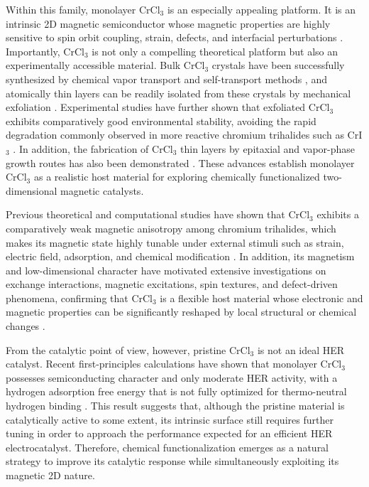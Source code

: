 \documentclass[journal=jacsat,manuscript=article]{achemso}
\begin{document}
Within this family, monolayer CrCl$_3$ is an especially appealing platform. It is an intrinsic 2D magnetic semiconductor whose magnetic properties are highly sensitive to spin orbit coupling, strain, defects, and interfacial perturbations \cite{Xue2019,Webster2018,Dupont2021,Lee2026,Zhu2025}. Importantly, CrCl$_3$ is not only a compelling theoretical platform but also an experimentally accessible material. Bulk CrCl$_3$ crystals have been successfully synthesized by chemical vapor transport \cite{Abdel-Hafiez2025} and self-transport methods \cite{Mastrippolito2021}, and atomically thin layers can be readily isolated from these crystals by mechanical exfoliation \cite{Kazim_2020}. Experimental studies have further shown that exfoliated CrCl$_3$ exhibits comparatively good environmental stability, avoiding the rapid degradation commonly observed in more reactive chromium trihalides such as CrI$_3$ \cite{Mastrippolito2021}. In addition, the fabrication of CrCl$_3$ thin layers by epitaxial and vapor-phase growth routes has also been demonstrated \cite{Bedoya2021,Wang2022}. These advances establish monolayer CrCl$_3$ as a realistic host material for exploring chemically functionalized two-dimensional magnetic catalysts.

Previous theoretical and computational studies have shown that CrCl$_3$ exhibits a comparatively weak magnetic anisotropy among chromium trihalides, which makes its magnetic state highly tunable under external stimuli such as strain, electric field, adsorption, and chemical modification \cite{Webster2018,Ebrahimian2023,Esteras2023}. In addition, its magnetism and low-dimensional character have motivated extensive investigations on exchange interactions, magnetic excitations, spin textures, and defect-driven phenomena, confirming that CrCl$_3$ is a flexible host material whose electronic and magnetic properties can be significantly reshaped by local structural or chemical changes \cite{Sarkar2021,Stagraczynski2024,Esquembre-Kucukalic2025,Lu2020,Mastrippolito2021}.

From the catalytic point of view, however, pristine CrCl$_3$ is not an ideal HER catalyst. Recent first-principles calculations have shown that monolayer CrCl$_3$ possesses semiconducting character and only moderate HER activity, with a hydrogen adsorption free energy that is not fully optimized for thermo-neutral hydrogen binding \cite{Zala2024}. This result suggests that, although the pristine material is catalytically active to some extent, its intrinsic surface still requires further tuning in order to approach the performance expected for an efficient HER electrocatalyst. Therefore, chemical functionalization emerges as a natural strategy to improve its catalytic response while simultaneously exploiting its magnetic 2D nature.
\end{document}
